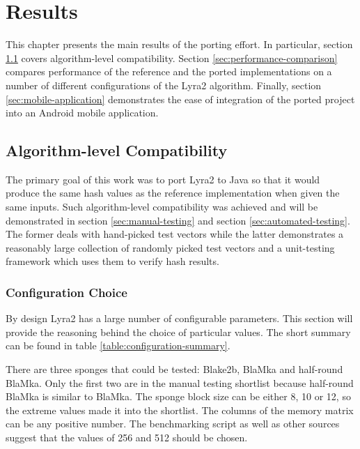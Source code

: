 \chapter{Results}
\label{sec:results}

This chapter presents the main results of the porting effort. In particular, section \ref{sec:it-works} covers algorithm-level compatibility. Section \ref{sec:performance-comparison} compares performance of the reference and the ported implementations on a number of different configurations of the Lyra2 algorithm. Finally, section \ref{sec:mobile-application} demonstrates the ease of integration of the ported project into an Android mobile application.

\section{Algorithm-level Compatibility}
\label{sec:it-works}

The primary goal of this work was to port Lyra2 to Java so that it would produce the same hash values as the reference implementation when given the same inputs. Such algorithm-level compatibility was achieved and will be demonstrated in section \ref{sec:manual-testing} and section \ref{sec:automated-testing}. The former deals with hand-picked test vectors while the latter demonstrates a reasonably large collection of randomly picked test vectors and a unit-testing framework which uses them to verify hash results.

\subsection{Configuration Choice}
By design Lyra2 has a large number of configurable parameters. This section will provide the reasoning behind the choice of particular values. The short summary can be found in table \ref{table:configuration-summary}.

There are three sponges that could be tested: Blake2b, BlaMka and half-round BlaMka. Only the first two are in the manual testing shortlist because half-round BlaMka is similar to BlaMka. The sponge block size can be either 8, 10 or 12, so the extreme values made it into the shortlist. The columns of the memory matrix can be any positive number. The  benchmarking script as well as other sources suggest that the values of 256 and 512 should be chosen.

